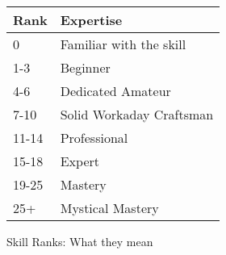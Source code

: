 \begin{SHTable}
	\begin{tabular}{ll}
    Rank & Expertise \\
\hline
	0           & Familiar with the skill \\
	1-3         & Beginner \\
	4-6         & Dedicated Amateur \\
	7-10        & Solid Workaday Craftsman \\
	11-14       & Professional \\
	15-18       & Expert \\
	19-25       & Mastery \\
	25+         & Mystical Mastery \\
	\end{tabular}
    \caption{Skill Ranks: What they mean}\label{Table:SkillRanks}
\end{SHTable}


